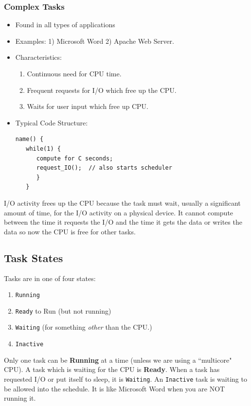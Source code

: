 \subsubsection{Complex Tasks}
\begin{itemize}
        \item Found in all types of applications
        \item Examples: 1) Microsoft Word \hspace{0.15in}     2) Apache Web Server.

        \item Characteristics:
                \begin{enumerate}
                        \item Continuous need for CPU time.
                        \item Frequent requests for I/O which free up the CPU.
                        \item Waits for user input which free up CPU.
                \end{enumerate}
         \item Typical Code Structure:
\begin{verbatim}
name() {
   while(1) {
      compute for C seconds;
      request_IO();  // also starts scheduler
      }
   }
\end{verbatim}
\end{itemize}
I/O activity frees up the CPU because the task must wait, usually a significant amount of
time, for the I/O activity on a physical device.  It cannot compute between the time it requests
the I/O and the time it gets the data or writes the data so now the CPU is free for other tasks.

\subsection{Task States}\label{TaskStates}
Tasks are in one of four states:
\begin{enumerate}
        \item {\tt Running} 
        \item {\tt Ready} to Run (but not running)
        \item {\tt Waiting}    (for something {\it other} than the CPU.)
        \item {\tt Inactive}   
\end{enumerate}
Only one task can be {\bf Running} at a time (unless we are using a ``multicore" CPU).  
A task which is waiting for the CPU 
is {\bf Ready}.  When a task has requested
I/O or put itself to sleep, it is {\tt Waiting}.
An {\tt Inactive} task is waiting to be allowed into the schedule.  It is like 
Microsoft Word when you are NOT running it. 

